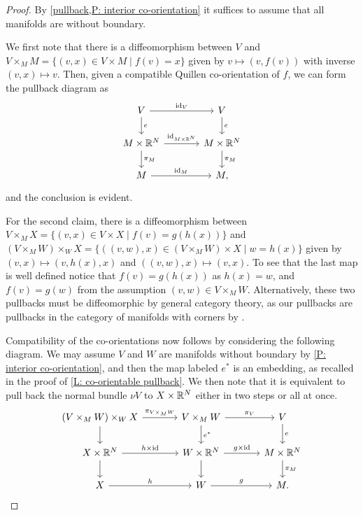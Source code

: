 \begin{proof}
	By \cref{pullback,P: interior co-orientation} it suffices to assume that all manifolds are without boundary.

	We first note that there is a diffeomorphism between $V$ and $V \times_M M = \{(v,x) \in V \times M \mid f(v) = x\}$ given by $v \mapsto (v,f(v))$ with inverse $(v,x) \mapsto v$.
	Then, given a compatible Quillen co-orientation of $f$, we can form the pullback diagram as
	\[
	\begin{tikzcd}[column sep=large]
		V \arrow[r, "\id_V"] \arrow[d,"e"] & V \arrow[d,"e"] \\
		M \times \R^N \arrow[r, "\id_{M \times \R^N}"] \arrow[d,"\pi_M"] & M \times \R^N \arrow[d,"\pi_M"] \\
		M \arrow[r, "\id_M"] & M,
	\end{tikzcd}
	\]
	and the conclusion is evident.

	For the second claim, there is a diffeomorphism between $V \times_M X = \{(v,x) \in V \times X \mid f(v) = g(h(x))\}$ and $(V \times_M W) \times_W X = \{((v,w),x) \in (V \times_M W) \times X \mid w = h(x)\}$ given by $(v,x) \mapsto (v,h(x),x)$ and $((v,w),x) \mapsto (v,x)$.
	To see that the last map is well defined notice that $f(v) = g(h(x))$ as $h(x) = w$, and $f(v) = g(w)$ from the assumption $(v,w) \in V \times_M W$.
	Alternatively, these two pullbacks must be diffeomorphic by general category theory, as our pullbacks are pullbacks in the category of manifolds with corners by \cite[Section 6]{Joy12}.

	Compatibility of the co-orientations now follows by considering the following diagram.
	We may assume $V$ and $W$ are manifolds without boundary by \cref{P: interior co-orientation}, and then the map labeled $e^*$ is an embedding, as recalled in the proof of \cref{L: co-orientable pullback}.
	We then note that it is equivalent to pull back the normal bundle $\nu V$ to $X \times \mathbb{R}^N$ either in two steps or all at once.
	\[
	\begin{tikzcd}[column sep=large]
		(V \times_M W) \times_W X \arrow[r, "\pi_{V \times_M W}"] \arrow[d] & V \times_M W \arrow[r, "\pi_V"] \arrow[d,"e^*"] & V \arrow[d, "e"] \\
		X \times \R^N \arrow[r, "h \times \id"] \arrow[d] & W \times \R^N \arrow[r, "g \times \id"] \arrow[d] & M \times \R^N \arrow[d, "\pi_M"] \\
		X \arrow[r, "h"] & W \arrow[r, "g"] & M.
	\end{tikzcd}
	\]
\end{proof}


